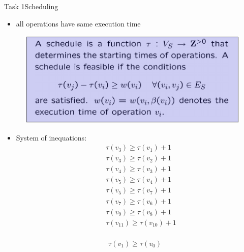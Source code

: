 \begin{frame}[allowframebreaks]{Task 1}{Scheduling}
\begin{tasknoinc}
\begin{itemize}
      \item all operations have same execution time
    \end{itemize}
  \end{tasknoinc}
  \framebreak
  \begin{requirementsnoinc}
    \begin{figure}
      \centering
      \includegraphics[height=0.4\paperheight]{./figures/task1_scheduleable.png}
    \end{figure}
  \end{requirementsnoinc}
  \begin{solutionnoinc}
    \begin{itemize}
      \item System of inequations:
        \[
          \begin{aligned}
            & \tau\left(v_3\right)\ge\tau\left(v_1\right)+1 \\
            & \tau\left(v_3\right)\ge\tau\left(v_2\right)+1 \\
            & \tau\left(v_4\right)\ge\tau\left(v_3\right)+1 \\
            & \tau\left(v_5\right)\ge\tau\left(v_4\right)+1 \\
            & \tau\left(v_5\right)\ge\tau\left(v_7\right)+1 \\
            & \tau\left(v_7\right)\ge\tau\left(v_6\right)+1 \\
            & \tau\left(v_9\right)\ge\tau\left(v_8\right)+1 \\
            & \tau\left(v_{11}\right)\ge\tau\left(v_{10}\right)+1 \\
          \end{aligned}
        \]
    \end{itemize}
  \end{solutionnoinc}
  \begin{solution}
        \[
          \begin{aligned}
            & \tau\left(v_1\right)\ge\tau\left(v_0\right) \\

\end{aligned}\]
\end{solution}
\end{frame}
